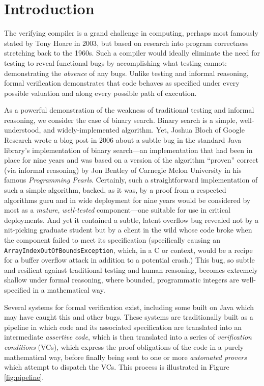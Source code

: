 \chapter{Introduction}\label{sect:introduction}
The verifying compiler is a grand challenge in computing, perhaps most famously stated by Tony Hoare in 2003\cite{hoareGrandChallenge}, but based on research into program correctness stretching back to the 1960s\cite{hoareAxiomaticProgramming}.  Such a compiler would ideally eliminate the need for testing to reveal functional bugs by accomplishing what testing cannot: demonstrating the \emph{absence} of any bugs.  Unlike testing and informal reasoning, formal verification demonstrates that code behaves as specified under every possible valuation and along every possible path of execution.

As a powerful demonstration of the weakness of traditional testing and informal reasoning, we consider the case of binary search.  Binary search is a simple, well-understood, and widely-implemented algorithm.  Yet, Joshua Bloch of Google Research wrote a blog post\cite{blochBinarySearch} in 2006 about a subtle bug in the standard Java library's implementation of binary search---an implementation that had been in place for nine years and was based on a version of the algorithm ``proven'' correct (via informal reasoning) by Jon Bentley of Carnegie Melon University in his famous \emph{Programming Pearls}\cite{bentleyProgrammingPearls}.  Certainly, such a straightforward implementation of such a simple algorithm, backed, as it was, by a proof from a respected algorithms guru and in wide deployment for nine years would be considered by most as a \emph{mature}, \emph{well-tested} component---one suitable for use in critical deployments.  And yet it contained a subtle, latent overflow bug revealed not by a nit-picking graduate student but by a client in the wild whose code broke when the component failed to meet its specification (specifically causing an \texttt{ArrayIndexOutOfBoundsException}, which, in a C or \cplusplus context, would be a recipe for a buffer overflow attack in addition to a potential crash.)  This bug, so subtle and resilient against traditional testing and human reasoning, becomes extremely shallow under formal reasoning, where bounded, programmatic integers are well-specified in a mathematical way.

Several systems for formal verification exist, including some built on Java which may have caught this and other bugs.  These systems are traditionally built as a pipeline in which code and its associated specification are translated into an intermediate \emph{assertive code}, which is then translated into a series of \emph{verification conditions} (VCs), which express the proof obligations of the code in a purely mathematical way, before finally being sent to one or more \emph{automated provers} which attempt to dispatch the VCs.  This process is illustrated in Figure \ref{fig:pipeline}.

